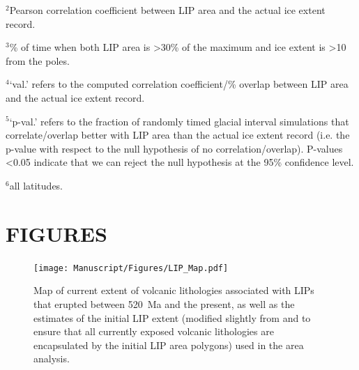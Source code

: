 \documentclass[11pt,letterpaper]{article}
\begin{document}
\begin{table}[h!]
\begin{tablenotes}
$^{2}$Pearson correlation coefficient between LIP area and the actual ice extent record.
\vspace{0.15cm}

$^{3}$\% of time when both LIP area is \textgreater30\% of the maximum and ice extent is \textgreater10\textdegree\xspace from the poles.
\vspace{0.15cm}

$^{4}$`val.' refers to the computed correlation coefficient/\% overlap between LIP area and the actual ice extent record.
\vspace{0.15cm}

$^{5}$`p-val.' refers to the fraction of randomly timed glacial interval simulations that correlate/overlap better with LIP area than the actual ice extent record (i.e. the p-value with respect to the null hypothesis of no correlation/overlap). P-values \textless0.05 indicate that we can reject the null hypothesis at the 95\% confidence level.
\vspace{0.15cm}

$^{6}$all latitudes.
\end{tablenotes}
\label{tab:stats}
\end{table}

\clearpage
\newpage

\section*{FIGURES}

\begin{figure}[h!]
\begin{center}
	\texttt{[image: Manuscript/Figures/LIP\_Map.pdf]}
	\caption{Map of current extent of volcanic lithologies associated with LIPs that erupted between 520~Ma and the present, as well as the estimates of the initial LIP extent (modified slightly from \citealt{Ernst2017a} and \citealt{Ernst2019a} to ensure that all currently exposed volcanic lithologies are encapsulated by the initial LIP area polygons) used in the area analysis.}
	\label{fig:LIP_map}
\end{center}
\end{figure}
\end{document}
